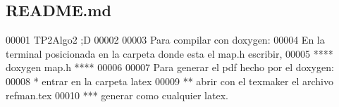 \hypertarget{README_8md_source}{}\subsection{R\+E\+A\+D\+M\+E.\+md}

\begin{DoxyCode}
00001 TP2Algo2 ;D
00002 
00003 Para compilar con doxygen:
00004    En la terminal posicionada en la carpeta donde esta el map.h escribir,
00005    ****     doxygen map.h    ****
00006 
00007 Para generar el pdf hecho por el doxygen:
00008    * entrar en la carpeta latex
00009    ** abrir con el texmaker el archivo refman.tex
00010    *** generar como cualquier latex.
\end{DoxyCode}
